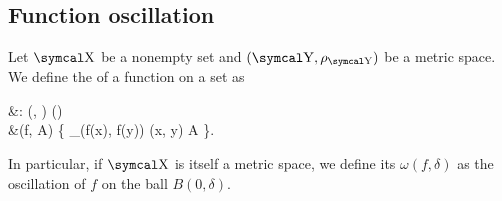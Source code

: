 \subsection{Function oscillation}\label{subsec:function_oscillation}

\begin{definition}\label{def:function_oscillation}
  Let \( \CX \) be a nonempty set and \( (\CY, \rho_{\CY}) \) be a metric space. We define the  of a function on a set as
  \begin{BreakableAlign*}
     &\omega: \Fun(\CX, \CY) \times \Pow(\CX) \to [0, \infty] \\
     &\omega(f, A) \coloneqq \sup \Big\{ \rho_{\CY}(f(x), f(y)) \colon (x, y) \in A \Big\}.
  \end{BreakableAlign*}

  In particular, if \( \CX \) is itself a metric space, we define its  \( \omega(f, \delta) \) as the oscillation of \( f \) on the ball \( B(0, \delta) \).
\end{definition}


